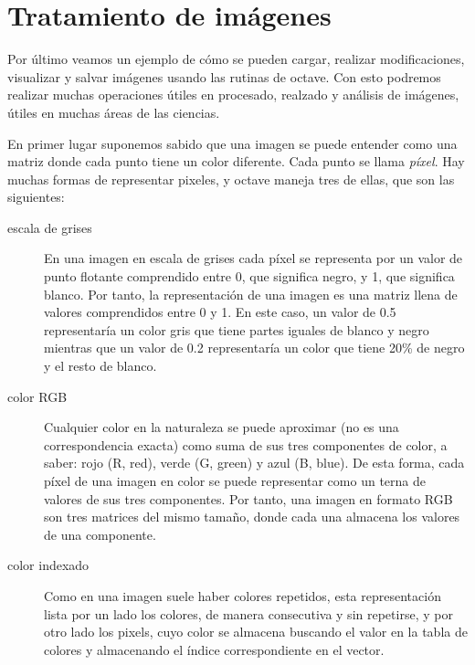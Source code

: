 
\section{Tratamiento de imágenes}


Por  último veamos  un  ejemplo  de cómo  se  pueden cargar,  realizar
modificaciones,  visualizar y  salvar imágenes  usando las  rutinas de
octave.  Con  esto  podremos  realizar muchas  operaciones  útiles  en
procesado, realzado y análisis de  imágenes, útiles en muchas áreas de
las ciencias.

En primer lugar suponemos sabido que una imagen se puede entender como
una matriz  donde cada punto tiene  un color diferente. Cada  punto se
llama {\em píxel}. Hay muchas  formas de representar pixeles, y octave
maneja tres de ellas, que son las siguientes:

\begin{description}

\item[escala de grises]  En una imagen en escala de  grises cada píxel
se  representa  por  un  valor de  punto  flotante  comprendido  entre
0,  que  significa  negro,  y  1, que  significa  blanco.  Por  tanto,
la  representación  de una  imagen  es  una  matriz llena  de  valores
comprendidos entre 0 y 1. En  este caso, un valor de 0.5 representaría
un color gris que tiene partes  iguales de blanco y negro mientras que
un valor de  0.2 representaría un color  que tiene 20\% de  negro y el
resto de blanco.

\item[color RGB] Cualquier  color en la naturaleza  se puede aproximar
(no es una  correspondencia exacta) como suma de  sus tres componentes
de color, a saber:  rojo (R, red), verde (G, green)  y azul (B, blue).
De esta forma, cada píxel de  una imagen en color se puede representar
como  un terna  de valores  de sus  tres componentes.  Por tanto,  una
imagen en formato  RGB son tres matrices del mismo  tamaño, donde cada
una almacena los valores de una componente.

\item[color  indexado]   Como  en  una  imagen   suele  haber  colores
repetidos,  esta representación  lista  por un  lado  los colores,  de
manera consecutiva y  sin repetirse, y por otro lado  los pixels, cuyo
color  se  almacena  buscando  el  valor en  la  tabla  de  colores  y
almacenando el índice correspondiente en el vector.

\end{description}

